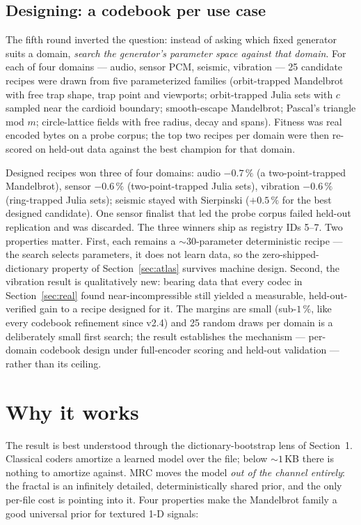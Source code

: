 \documentclass[11pt,a4paper]{article}
\begin{document}
\subsection{Designing: a codebook per use case}

The fifth round inverted the question: instead of asking which fixed
generator suits a domain, \emph{search the generator's parameter space
against that domain}. For each of four domains --- audio, sensor PCM,
seismic, vibration --- 25 candidate recipes were drawn from five
parameterized families (orbit-trapped Mandelbrot with free trap shape, trap
point and viewports; orbit-trapped Julia sets with $c$ sampled near the
cardioid boundary; smooth-escape Mandelbrot; Pascal's triangle mod $m$;
circle-lattice fields with free radius, decay and spans). Fitness was real
encoded bytes on a probe corpus; the top two recipes per domain were then
re-scored on held-out data against the best champion for that domain.

Designed recipes won three of four domains: audio $-0.7\,\%$ (a
two-point-trapped Mandelbrot), sensor $-0.6\,\%$ (two-point-trapped Julia
sets), vibration $-0.6\,\%$ (ring-trapped Julia sets); seismic stayed with
Sierpinski ($+0.5\,\%$ for the best designed candidate). One sensor finalist
that led the probe corpus failed held-out replication and was discarded.
The three winners ship as registry IDs 5--7. Two properties matter. First,
each remains a ${\sim}30$-parameter deterministic recipe --- the search
selects parameters, it does not learn data, so the zero-shipped-dictionary
property of Section~\ref{sec:atlas} survives machine design. Second, the
vibration result is qualitatively new: bearing data that every codec in
Section~\ref{sec:real} found near-incompressible still yielded a measurable,
held-out-verified gain to a recipe designed for it. The margins are small
(sub-$1\,\%$, like every codebook refinement since v2.4) and 25 random draws
per domain is a deliberately small first search; the result establishes the
mechanism --- per-domain codebook design under full-encoder scoring and
held-out validation --- rather than its ceiling.

\section{Why it works}
\label{sec:why}

The result is best understood through the dictionary-bootstrap lens of
Section~1. Classical coders amortize a learned model over the file; below
${\sim}1$\,KB there is nothing to amortize against. MRC moves the model
\emph{out of the channel entirely}: the fractal is an infinitely detailed,
deterministically shared prior, and the only per-file cost is pointing into
it. Four properties make the Mandelbrot family a good universal prior for
textured 1-D signals:
\end{document}
